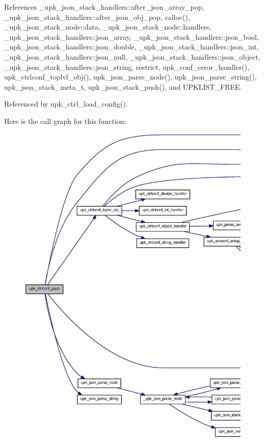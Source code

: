 References \_\-upk\_\-json\_\-stack\_\-handlers::after\_\-json\_\-array\_\-pop, \_\-upk\_\-json\_\-stack\_\-handlers::after\_\-json\_\-obj\_\-pop, calloc(), \_\-upk\_\-json\_\-stack\_\-node::data, \_\-upk\_\-json\_\-stack\_\-node::handlers, \_\-upk\_\-json\_\-stack\_\-handlers::json\_\-array, \_\-upk\_\-json\_\-stack\_\-handlers::json\_\-bool, \_\-upk\_\-json\_\-stack\_\-handlers::json\_\-double, \_\-upk\_\-json\_\-stack\_\-handlers::json\_\-int, \_\-upk\_\-json\_\-stack\_\-handlers::json\_\-null, \_\-upk\_\-json\_\-stack\_\-handlers::json\_\-object, \_\-upk\_\-json\_\-stack\_\-handlers::json\_\-string, restrict, upk\_\-conf\_\-error\_\-handler(), upk\_\-ctrlconf\_\-toplvl\_\-obj(), upk\_\-json\_\-parse\_\-node(), upk\_\-json\_\-parse\_\-string(), upk\_\-json\_\-stack\_\-meta\_\-t, upk\_\-json\_\-stack\_\-push(), and UPKLIST\_\-FREE.



Referenced by upk\_\-ctrl\_\-load\_\-config().



Here is the call graph for this function:
\nopagebreak
\begin{figure}[H]
\begin{center}
\leavevmode
\includegraphics[width=400pt]{group__config__impl_ga141b988b89261c395ef928630abd7492_cgraph}
\end{center}
\end{figure}




